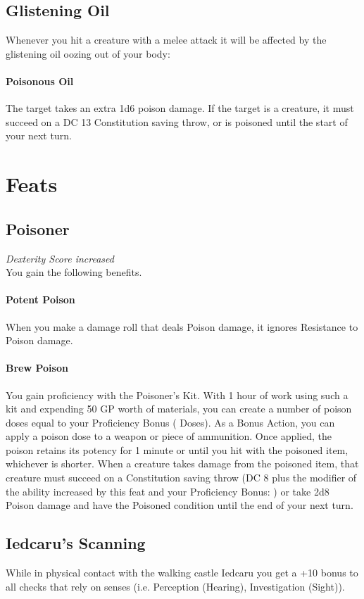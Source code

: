 \documentclass[letterpaper,openany,oneside,twocolumn]{book}
\begin{document}
\subsection*{Glistening Oil}
Whenever you hit a creature with a melee attack it will be affected by the glistening oil oozing out of your body:
\paragraph*{Poisonous Oil} The target takes an extra 1d6 poison damage. If the target is a creature, it must succeed on a DC 13 Constitution saving throw, or is poisoned until the start of your next turn.

\section*{Feats}
\subsection*{Poisoner}
\textit{Dexterity Score increased}\\
You gain the following benefits.
\paragraph*{Potent Poison} When you make a damage roll that deals Poison damage, it ignores Resistance to Poison damage.
\paragraph*{Brew Poison} You gain proficiency with the Poisoner's Kit. With 1 hour of work using such a kit and expending 50 GP worth of materials, you can create a number of poison doses equal to your Proficiency Bonus (\textbf{} Doses). As a Bonus Action, you can apply a poison dose to a weapon or piece of ammunition. Once applied, the poison retains its potency for 1 minute or until you hit with the poisoned item, whichever is shorter. When a creature takes damage from the poisoned item, that creature must succeed on a Constitution saving throw (DC 8 plus the modifier of the ability increased by this feat and your Proficiency Bonus: \textbf{}) or take 2d8 Poison damage and have the Poisoned condition until the end of your next turn.
\subsection*{Iedcaru's Scanning}
While in physical contact with the walking castle Iedcaru you get a +10 bonus to all checks that rely on senses (i.e. Perception (Hearing), Investigation (Sight)).
\end{document}
